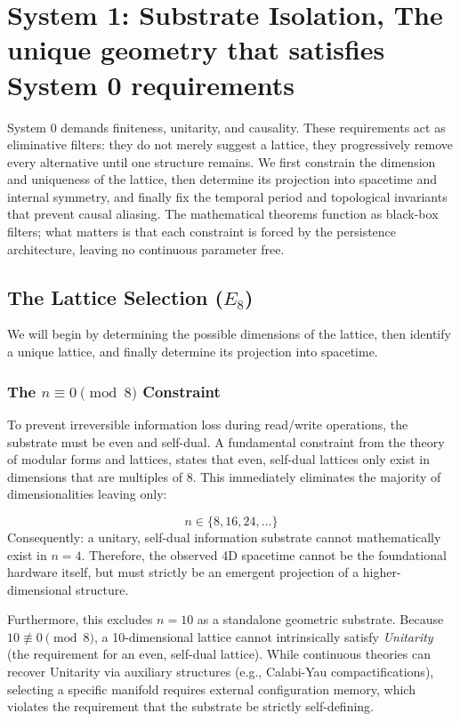 \section{System 1: Substrate Isolation, The unique geometry that satisfies System 0 requirements}
\label{sec:system1_projection}
System 0 demands finiteness, unitarity, and causality. These requirements act as eliminative filters: they do not merely suggest a lattice, they progressively remove every alternative until one structure remains. We first constrain the dimension and uniqueness of the lattice, then determine its projection into spacetime and internal symmetry, and finally fix the temporal period and topological invariants that prevent causal aliasing. The mathematical theorems function as black-box filters; what matters is that each constraint is forced by the persistence architecture, leaving no continuous parameter free.

\subsection{The Lattice Selection (\texorpdfstring{$E_8$}{E8})}
\label{sec:lattice_selection}

We will begin by determining the possible dimensions of the lattice, then identify a unique lattice, and finally determine its projection into spacetime.

\subsubsection{The \texorpdfstring{$n \equiv 0 \pmod 8$}{neq0mod8} Constraint}
\label{sec:kneserstheorem}
To prevent irreversible information loss during read/write operations, the substrate must be even and self-dual. A fundamental constraint from the theory of modular forms and lattices\cite{conway_sphere_1988}, states that even, self-dual lattices only exist in dimensions that are multiples of 8. This immediately eliminates the majority of dimensionalities leaving only: 

\[ n \in \{8, 16, 24, \dots\} \]
Consequently: a unitary, self-dual information substrate cannot mathematically exist in $n=4$. Therefore, the observed 4D spacetime cannot be the foundational hardware itself, but must strictly be an emergent projection of a higher-dimensional structure.

Furthermore, this excludes $n = 10$ as a standalone geometric substrate. Because $10 \not\equiv 0 \pmod 8$, a 10-dimensional lattice cannot intrinsically satisfy \textit{Unitarity} (the requirement for an even, self-dual lattice). While continuous theories can recover Unitarity via auxiliary structures (e.g., Calabi-Yau compactifications), selecting a specific manifold requires external configuration memory, which violates the requirement that the substrate be strictly self-defining.

